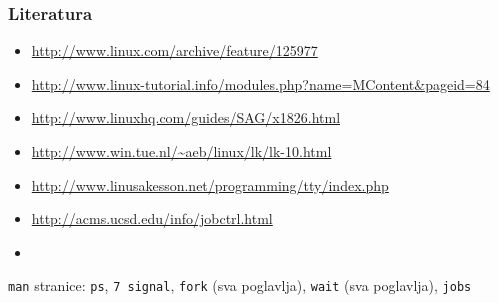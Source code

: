 \documentclass[table,usenames,dvipsnames]{beamer}
\newcommand{\shell}[1]{\texttt{#1}}
\begin{document}
\begin{frame}[t]
	\frametitle{Literatura}
	\begin{itemize}
	  \item \url{http://www.linux.com/archive/feature/125977}
	  \item \url{http://www.linux-tutorial.info/modules.php?name=MContent&pageid=84}
	  \item \url{http://www.linuxhq.com/guides/SAG/x1826.html}
	  \item \url{http://www.win.tue.nl/~aeb/linux/lk/lk-10.html}
	  \item \url{http://www.linusakesson.net/programming/tty/index.php}\\
	  \item \url{http://acms.ucsd.edu/info/jobctrl.html}
	  \item[]
	\end{itemize}
	\shell{man} stranice: \shell{ps}, \shell{7 signal}, \shell{fork} (sva poglavlja), \shell{wait} (sva poglavlja), \shell{jobs}
\end{frame}
\end{document}
